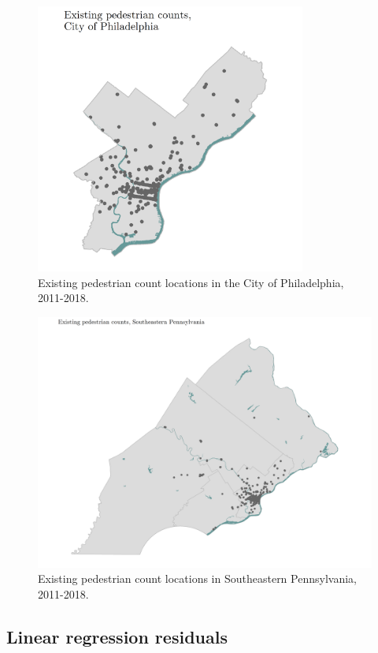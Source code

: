 \documentclass[paper=letterpaper, fontsize=11pt]{scrartcl}
\begin{document}
\begin{figure}[!htbp]
	\centering
	\includegraphics[width = 3.5in]{phila-counters.png}
	\caption{Existing pedestrian count locations in the City of Philadelphia, 2011-2018.} \label{phila-count-locations}
\end{figure}

\FloatBarrier
\begin{figure}
	\centering
	\includegraphics[width = 9in]{region-counters.png}
	\caption{Existing pedestrian count locations in Southeastern Pennsylvania, 2011-2018.} \label{region-count-locations}
\end{figure}
\FloatBarrier

\subsection{Linear regression residuals}
\end{document}
